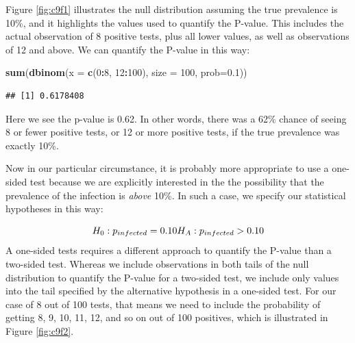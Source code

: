 \documentclass[
]{book}
\newenvironment{Shaded}{\begin{snugshade}}{\end{snugshade}}
\newcommand{\AttributeTok}[1]{\textcolor[rgb]{0.13,0.29,0.53}{#1}}
\newcommand{\DecValTok}[1]{\textcolor[rgb]{0.00,0.00,0.81}{#1}}
\newcommand{\FloatTok}[1]{\textcolor[rgb]{0.00,0.00,0.81}{#1}}
\newcommand{\FunctionTok}[1]{\textcolor[rgb]{0.13,0.29,0.53}{\textbf{#1}}}
\newcommand{\NormalTok}[1]{#1}
\newcommand{\SpecialCharTok}[1]{\textcolor[rgb]{0.81,0.36,0.00}{\textbf{#1}}}
\begin{document}
Figure \ref{fig:c9f1} illustrates the null distribution assuming the true prevalence is 10\%, and it highlights the values used to quantify the P-value. This includes the actual observation of 8 positive tests, plus all lower values, as well as observations of 12 and above. We can quantify the P-value in this way:

\begin{Shaded}
\begin{Highlighting}[]
\FunctionTok{sum}\NormalTok{(}\FunctionTok{dbinom}\NormalTok{(}\AttributeTok{x =} \FunctionTok{c}\NormalTok{(}\DecValTok{0}\SpecialCharTok{:}\DecValTok{8}\NormalTok{, }\DecValTok{12}\SpecialCharTok{:}\DecValTok{100}\NormalTok{), }\AttributeTok{size =} \DecValTok{100}\NormalTok{, }\AttributeTok{prob=}\FloatTok{0.1}\NormalTok{))}
\end{Highlighting}
\end{Shaded}

\begin{verbatim}
## [1] 0.6178408
\end{verbatim}

Here we see the p-value is 0.62. In other words, there was a 62\% chance of seeing 8 or fewer positive tests, or 12 or more positive tests, if the true prevalence was exactly 10\%.

Now in our particular circumstance, it is probably more appropriate to use a one-sided test because we are explicitly interested in the the possibility that the prevalence of the infection is \emph{above} 10\%. In such a case, we specify our statistical hypotheses in this way:

\[
H_0: p_{infected}=0.10 \\
H_A: p_{infected}>0.10
\] A one-sided tests requires a different approach to quantify the P-value than a two-sided test. Whereas we include observations in both tails of the null distribution to quantify the P-value for a two-sided test, we include only values into the tail specified by the alternative hypothesis in a one-sided test. For our case of 8 out of 100 tests, that means we need to include the probability of getting 8, 9, 10, 11, 12, and so on out of 100 positives, which is illustrated in Figure \ref{fig:c9f2}.
\end{document}
